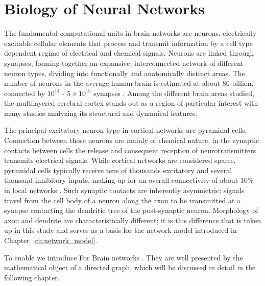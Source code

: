 \section{Biology of Neural Networks}\label{sec:Biology} 



The fundamental computational units in brain networks are
neurons, electrically excitable cellular elements that
process and transmit information by a cell type dependent regime of
electrical and chemical signals. Neurons are linked through
synapses, forming together an expansive, interconnected
network of different neuron types, dividing into functionally and
anatomically distinct areas. The number of neurons in the average
human brain is estimated at about 86 billion, connected by
$10^{14}$ - $5\times10^{15}$ synapses \parencite{Herculano2009,
  Drachman2005}. Among the different brain areas studied, the
multilayered cerebral cortex stands out as a region of
particular interest with many studies analyzing its structural and
dynamical features.

The principal excitatory neuron type in cortical
networks are pyramidal cells. Connection between those neurons are mainly of chemical
nature, in the synaptic contacts between cells the release and
consequent reception of neurotransmitters transmits electrical
signals. While cortical networks are considered sparse, pyramidal
cells typically receive tens of thousands excitatory and several
thousand inhibitory inputs, making up for an overall connectivity of
about $10\%$ in local networks \parencite{Spruston2009}. Such synaptic
contacts are inherently asymmetric; signals travel from the cell body
of a neuron along the axon to be transmitted at a synapse contacting
the dendritic tree of the post-synaptic neuron. Morphology of axon and
dendrite are characteristically different; it is this difference that
is taken up in this study and serves as a basis for the network model introduced in Chapter~\ref{ch:network_model}.

To enable we introduce 
For Brain networks . They are well presented by the mathematical
object of a directed graph, which will be discussed in detail in the
following chapter.









